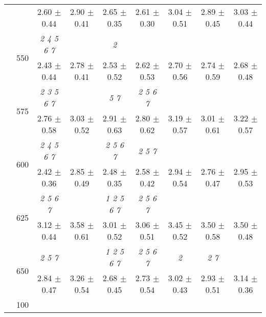 \begin{table}[h]
{\begin{tabular}{
        ccccccccc}
 & & \cellcolor[HTML]{EFEFEF} 2.60 $\pm$ 0.44& \cellcolor[HTML]{EFEFEF} 2.90 $\pm$ 0.41& \cellcolor[HTML]{EFEFEF} 2.65 $\pm$ 0.35& \cellcolor[HTML]{EFEFEF} 2.61 $\pm$ 0.30& \cellcolor[HTML]{EFEFEF} 3.04 $\pm$ 0.51& \cellcolor[HTML]{EFEFEF} 2.89 $\pm$ 0.45& \cellcolor[HTML]{EFEFEF} 3.03 $\pm$ 0.44 \\ 
 & \multirow{2}{*}{550}& \textit{ 2 4 5 6 7 }& & \textit{ 2 }& & & &  \\ 
 & & 2.43 $\pm$ 0.44& 2.78 $\pm$ 0.41& 2.53 $\pm$ 0.52& 2.62 $\pm$ 0.53& 2.70 $\pm$ 0.56& 2.74 $\pm$ 0.59& 2.68 $\pm$ 0.48 \\ 
 & \multirow{2}{*}{575}& \cellcolor[HTML]{EFEFEF} \textit{ 2 3 5 6 7 }& \cellcolor[HTML]{EFEFEF} & \cellcolor[HTML]{EFEFEF} \textit{ 5 7 }& \cellcolor[HTML]{EFEFEF} \textit{ 2 5 6 7 }& \cellcolor[HTML]{EFEFEF} & \cellcolor[HTML]{EFEFEF} & \cellcolor[HTML]{EFEFEF}  \\ 
 & & \cellcolor[HTML]{EFEFEF} 2.76 $\pm$ 0.58& \cellcolor[HTML]{EFEFEF} 3.03 $\pm$ 0.52& \cellcolor[HTML]{EFEFEF} 2.91 $\pm$ 0.63& \cellcolor[HTML]{EFEFEF} 2.80 $\pm$ 0.62& \cellcolor[HTML]{EFEFEF} 3.19 $\pm$ 0.57& \cellcolor[HTML]{EFEFEF} 3.01 $\pm$ 0.61& \cellcolor[HTML]{EFEFEF} 3.22 $\pm$ 0.57 \\ 
 & \multirow{2}{*}{600}& \textit{ 2 4 5 6 7 }& & \textit{ 2 5 6 7 }& \textit{ 2 5 7 }& & &  \\ 
 & & 2.42 $\pm$ 0.36& 2.85 $\pm$ 0.49& 2.48 $\pm$ 0.35& 2.58 $\pm$ 0.42& 2.94 $\pm$ 0.54& 2.76 $\pm$ 0.47& 2.95 $\pm$ 0.53 \\ 
 & \multirow{2}{*}{625}& \cellcolor[HTML]{EFEFEF} \textit{ 2 5 6 7 }& \cellcolor[HTML]{EFEFEF} & \cellcolor[HTML]{EFEFEF} \textit{ 1 2 5 6 7 }& \cellcolor[HTML]{EFEFEF} \textit{ 2 5 6 7 }& \cellcolor[HTML]{EFEFEF} & \cellcolor[HTML]{EFEFEF} & \cellcolor[HTML]{EFEFEF}  \\ 
 & & \cellcolor[HTML]{EFEFEF} 3.12 $\pm$ 0.44& \cellcolor[HTML]{EFEFEF} 3.58 $\pm$ 0.61& \cellcolor[HTML]{EFEFEF} 3.01 $\pm$ 0.52& \cellcolor[HTML]{EFEFEF} 3.06 $\pm$ 0.51& \cellcolor[HTML]{EFEFEF} 3.45 $\pm$ 0.52& \cellcolor[HTML]{EFEFEF} 3.50 $\pm$ 0.58& \cellcolor[HTML]{EFEFEF} 3.50 $\pm$ 0.48 \\ 
 & \multirow{2}{*}{650}& \textit{ 2 5 7 }& & \textit{ 1 2 5 6 7 }& \textit{ 2 5 6 7 }& \textit{ 2 }& \textit{ 2 7 }&  \\ 
 & & 2.84 $\pm$ 0.47& 3.26 $\pm$ 0.54& 2.68 $\pm$ 0.45& 2.73 $\pm$ 0.54& 3.02 $\pm$ 0.43& 2.93 $\pm$ 0.51& 3.14 $\pm$ 0.36 \\ \midrule 
 & \multirow{2}{*}{100}& & & & & & &  \\ 

\end{tabular}}
\end{table}
